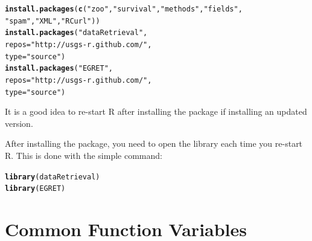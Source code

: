 \documentclass[a4paper,11pt]{article}\usepackage[]{graphicx}\usepackage[]{color}
\makeatletter
\newcommand{\hlstr}[1]{\textcolor[rgb]{0.192,0.494,0.8}{#1}}%
\newcommand{\hlstd}[1]{\textcolor[rgb]{0.345,0.345,0.345}{#1}}%
\newcommand{\hlkwc}[1]{\textcolor[rgb]{0.333,0.667,0.333}{#1}}%
\newcommand{\hlkwd}[1]{\textcolor[rgb]{0.737,0.353,0.396}{\textbf{#1}}}%
\newenvironment{kframe}{%
 \def\at@end@of@kframe{}%
 \ifinner\ifhmode%
  \def\at@end@of@kframe{\end{minipage}}%
  \begin{minipage}{\columnwidth}%
 \fi\fi%
 \def\FrameCommand##1{\hskip\@totalleftmargin \hskip-\fboxsep
 \colorbox{shadecolor}{##1}\hskip-\fboxsep
     \hskip-\linewidth \hskip-\@totalleftmargin \hskip\columnwidth}%
 \MakeFramed {\advance\hsize-\width
   \@totalleftmargin\z@ \linewidth\hsize
   \@setminipage}}%
 {\par\unskip\endMakeFramed%
 \at@end@of@kframe}
\newenvironment{knitrout}{}{} %
\makeatother
\begin{document}
\begin{knitrout}
\color{fgcolor}\begin{kframe}
\begin{alltt}
\hlkwd{install.packages}\hlstd{(}\hlkwd{c}\hlstd{(}\hlstr{"zoo"}\hlstd{,}\hlstr{"survival"}\hlstd{,}\hlstr{"methods"}\hlstd{,}\hlstr{"fields"}\hlstd{,}
                   \hlstr{"spam"}\hlstd{,}\hlstr{"XML"}\hlstd{,}\hlstr{"RCurl"}\hlstd{))}
\hlkwd{install.packages}\hlstd{(}\hlstr{"dataRetrieval"}\hlstd{,}
                 \hlkwc{repos}\hlstd{=}\hlstr{"http://usgs-r.github.com/"}\hlstd{,}
                 \hlkwc{type}\hlstd{=}\hlstr{"source"}\hlstd{)}
\hlkwd{install.packages}\hlstd{(}\hlstr{"EGRET"}\hlstd{,}
                 \hlkwc{repos}\hlstd{=}\hlstr{"http://usgs-r.github.com/"}\hlstd{,}
                 \hlkwc{type}\hlstd{=}\hlstr{"source"}\hlstd{)}
\end{alltt}
\end{kframe}
\end{knitrout}


It is a good idea to re-start R after installing the package if installing an updated version. 

After installing the package, you need to open the library each time you re-start R.  This is done with the simple command:
\begin{knitrout}
\color{fgcolor}\begin{kframe}
\begin{alltt}
\hlkwd{library}\hlstd{(dataRetrieval)}
\hlkwd{library}\hlstd{(EGRET)}
\end{alltt}
\end{kframe}
\end{knitrout}


\newpage
\FloatBarrier
\section{Common Function Variables}
\label{sec:appendixPlot}
\end{document}
